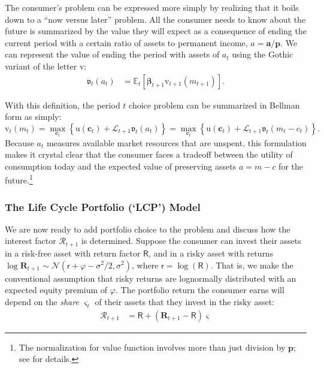 \documentclass{article}
\newcommand{\uFunc}{\mathrm{u}}
\newcommand{\cLvl}{\mathbf{c}}
\newcommand{\aLvl}{\mathbf{a}}
\newcommand{\Rport}{\mathcal{R}}
\newcommand{\pLvl}{\mathbf{p}}
\newcommand{\DiscFac}{\beta}
\newcommand{\vFunc}{\mathrm{v}}
\newcommand{\Alive}{\mathcal{L}}
\newcommand{\Ex}{\mathbb{E}}
\newcommand{\cNrm}{c}
\newcommand{\aNrm}{a}
\newcommand{\mNrm}{m}
\newcommand{\Rfree}{\mathsf{R}}
\newcommand{\rfree}{\mathsf{r}}
\newcommand{\eprem}{\varphi}
\newcommand{\Risky}{\mathbf{R}}
\begin{document}

The consumer's problem can be expressed more simply by realizing that it boils down to a ``now versus later'' problem.
All the consumer needs to know about the future is summarized by the value they will expect as a consequence of ending the current period with a certain ratio of assets to permanent income, $\aNrm = \aLvl/\pLvl$.
We can represent the value of ending the period with assets of $\aNrm_t$ using the Gothic variant of the letter $\vFunc$:
\begin{align}
    \mathfrak{v}_{t}(\aNrm_{t}) & = \Ex_{t}[\pmb{\DiscFac}_{t+1}\vFunc_{t+1}(\mNrm_{t+1})].
\end{align}

With this definition, the period $t$ choice problem can be summarized in Bellman form as simply:
\begin{equation}
\vFunc_t(\mNrm_t) = \max_{\cLvl_t} \left\{ \uFunc(\cLvl_{t}) + \Alive_{t+1} \mathfrak{v}_{t}(\aNrm_{t}) \right\} = \max_{\cLvl_t} \left\{ \uFunc(\cLvl_{t}) + \Alive_{t+1} \mathfrak{v}_{t}(\mNrm_{t} - \cNrm_t) \right\}.
\end{equation}
Because $\aNrm_t$ measures available market resources that are unspent, this formulation makes it crystal clear that the consumer faces a tradeoff between the utility of consumption today and the expected value of preserving assets $\aNrm=\mNrm -\cNrm$ for the future.\footnote{The normalization for value function involves more than just division by $\pLvl$; see \cite{BufferStockTheory} for details.}

\subsubsection{The Life Cycle Portfolio (`LCP') Model}\label{lcp-model}

We are now ready to add portfolio choice to the problem and discuss how the interest factor $\Rport_{t+1}$ is determined.
Suppose the consumer can invest their assets in a risk-free asset with return factor $\Rfree$, and in a risky asset with returns $\log \Risky_{t+1} \sim \mathcal{N}(\rfree + \eprem - \sigma^{2}/2, \sigma^{2})$, where $\rfree = \log(\Rfree)$.
That is, we make the conventional assumption that risky returns are lognormally distributed with an expected equity premium of $\eprem$.
The portfolio return the consumer earns will depend on the \textit{share} $\varsigma_t$ of their assets that they invest in the risky asset:
\begin{align}
    \Rport_{t+1} & = \Rfree + (\Risky_{t+1}-\Rfree)\varsigma
\end{align}
\end{document}
